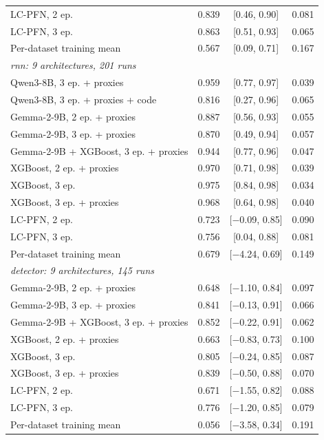 \begin{table}[t]
\begin{tabular}{lccc}
\quad LC-PFN, 2 ep. & 0.839 & [0.46, 0.90] & 0.081 \\
\quad LC-PFN, 3 ep. & 0.863 & [0.51, 0.93] & 0.065 \\
\quad Per-dataset training mean & 0.567 & [0.09, 0.71] & 0.167 \\
\midrule
\multicolumn{4}{l}{\textit{rnn: 9 architectures, 201 runs}} \\
\quad Qwen3-8B, 3 ep. + proxies & 0.959 & [0.77, 0.97] & 0.039 \\
\quad Qwen3-8B, 3 ep. + proxies + code & 0.816 & [0.27, 0.96] & 0.065 \\
\quad Gemma-2-9B, 2 ep. + proxies & 0.887 & [0.56, 0.93] & 0.055 \\
\quad Gemma-2-9B, 3 ep. + proxies & 0.870 & [0.49, 0.94] & 0.057 \\
\quad Gemma-2-9B + XGBoost, 3 ep. + proxies & 0.944 & [0.77, 0.96] & 0.047 \\
\quad XGBoost, 2 ep. + proxies & 0.970 & [0.71, 0.98] & 0.039 \\
\quad XGBoost, 3 ep. & 0.975 & [0.84, 0.98] & 0.034 \\
\quad XGBoost, 3 ep. + proxies & 0.968 & [0.64, 0.98] & 0.040 \\
\quad LC-PFN, 2 ep. & 0.723 & [$-$0.09, 0.85] & 0.090 \\
\quad LC-PFN, 3 ep. & 0.756 & [0.04, 0.88] & 0.081 \\
\quad Per-dataset training mean & 0.679 & [$-$4.24, 0.69] & 0.149 \\
\midrule
\multicolumn{4}{l}{\textit{detector: 9 architectures, 145 runs}} \\
\quad Gemma-2-9B, 2 ep. + proxies & 0.648 & [$-$1.10, 0.84] & 0.097 \\
\quad Gemma-2-9B, 3 ep. + proxies & 0.841 & [$-$0.13, 0.91] & 0.066 \\
\quad Gemma-2-9B + XGBoost, 3 ep. + proxies & 0.852 & [$-$0.22, 0.91] & 0.062 \\
\quad XGBoost, 2 ep. + proxies & 0.663 & [$-$0.83, 0.73] & 0.100 \\
\quad XGBoost, 3 ep. & 0.805 & [$-$0.24, 0.85] & 0.087 \\
\quad XGBoost, 3 ep. + proxies & 0.839 & [$-$0.50, 0.88] & 0.070 \\
\quad LC-PFN, 2 ep. & 0.671 & [$-$1.55, 0.82] & 0.088 \\
\quad LC-PFN, 3 ep. & 0.776 & [$-$1.20, 0.85] & 0.079 \\
\quad Per-dataset training mean & 0.056 & [$-$3.58, 0.34] & 0.191 \\

\end{tabular}
\end{table}
